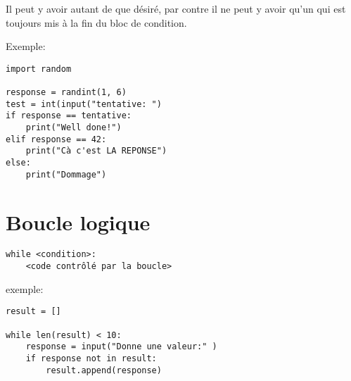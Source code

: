 \documentclass[10pt,a4paper,landscape]{article}
\begin{document}
\begin{multicols}{2}
Il peut y avoir autant de  que désiré, par contre il ne peut y avoir qu'un  qui est toujours mis à la fin du bloc de condition.

Exemple:

\begin{lstlisting}
import random

response = randint(1, 6)
test = int(input("tentative: ")
if response == tentative:
	print("Well done!")
elif response == 42:
	print("Cà c'est LA REPONSE")
else:
	print("Dommage")
\end{lstlisting}


\section{Boucle logique}

\begin{lstlisting}
while <condition>:
	<code contrôlé par la boucle>
\end{lstlisting}


{\normalsize exemple:}
\begin{lstlisting}
result = []
 
while len(result) < 10:
	response = input("Donne une valeur:" )
	if response not in result:	
		result.append(response)
\end{lstlisting}

\end{multicols}
\end{document}
